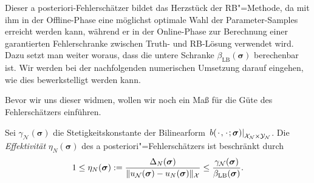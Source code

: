 \documentclass[../main.tex]{subfiles}
\begin{document}
Dieser a posteriori-Fehlerschätzer bildet das Herzstück der RB"=Methode, da mit ihm in der Offline-Phase eine möglichst optimale Wahl der Parameter-Samples erreicht werden kann, während er in der Online-Phase zur Berechnung einer garantierten Fehlerschranke zwischen Truth- und RB-Lösung verwendet wird.
Dazu setzt man weiter woraus, dass die untere Schranke $\beta_{\mathrm{LB}}(\bm \sigma)$ berechenbar ist.
Wir werden bei der nachfolgenden numerischen Umsetzung darauf eingehen, wie dies bewerkstelligt werden kann.

Bevor wir uns dieser widmen, wollen wir noch ein Maß für die Güte des Fehlerschätzers einführen.

\begin{Lemma}
\label{lemma:effektivitaet}
    Sei $\gamma_{\mathcal N}(\bm \sigma)$ die Stetigkeitskonstante der Bilinearform $\left.b({\mkern2mu\cdot\mkern2mu}, {\mkern2mu\cdot\mkern2mu}; \bm \sigma)\right|_{\mathcal X_{\mathcal N} \times \mathcal Y_{\mathcal N}}$.
    Die \emph{Effektivität} $\eta_{N}(\bm \sigma)$ des a posteriori"=Fehlerschätzers ist beschränkt durch
    \begin{equation}
        1 \leq \eta_{N}(\bm \sigma) := \frac{\Delta_{N}(\bm \sigma)}{\lVert u_{\mathcal N}(\bm \sigma) - u_{N}(\bm \sigma)\rVert_{\mathcal X}} \leq \frac{\gamma_{\mathcal N}(\bm \sigma)}{\beta_{\mathrm{LB}}(\bm \sigma)}.
    \end{equation}


\end{Lemma}
\end{document}
